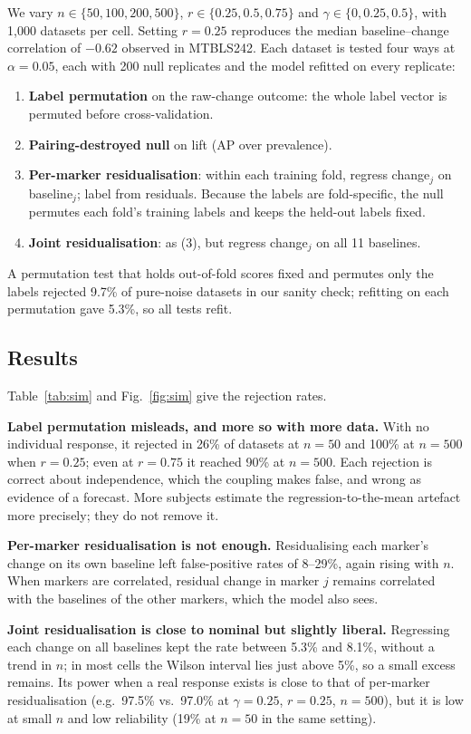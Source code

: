 \documentclass[conference]{IEEEtran}
\begin{document}
We vary $n\in\{50,100,200,500\}$, $r\in\{0.25,0.5,0.75\}$ and
$\gamma\in\{0,0.25,0.5\}$, with 1{,}000 datasets per cell. Setting $r=0.25$
reproduces the median baseline--change correlation of $-0.62$ observed in
MTBLS242. Each dataset is tested four ways at $\alpha=0.05$, each with 200
null replicates and the model refitted on every replicate:
\begin{enumerate}
  \item \textbf{Label permutation} on the raw-change outcome: the whole label
        vector is permuted before cross-validation.
  \item \textbf{Pairing-destroyed null} on lift (AP over prevalence).
  \item \textbf{Per-marker residualisation}: within each training fold,
        regress change$_j$ on baseline$_j$; label from residuals. Because
        the labels are fold-specific, the null permutes each fold's training
        labels and keeps the held-out labels fixed.
  \item \textbf{Joint residualisation}: as (3), but regress change$_j$ on all
        11 baselines.
\end{enumerate}
A permutation test that holds out-of-fold scores fixed and permutes only the
labels rejected 9.7\% of pure-noise datasets in our sanity check; refitting
on each permutation \cite{ojala2010} gave 5.3\%, so all tests refit.

\subsection{Results}
Table~\ref{tab:sim} and Fig.~\ref{fig:sim} give the rejection rates.

\textbf{Label permutation misleads, and more so with more data.} With no
individual response, it rejected in 26\% of datasets at $n=50$ and 100\% at
$n=500$ when $r=0.25$; even at $r=0.75$ it reached 90\% at $n=500$. Each
rejection is correct about independence, which the coupling makes false,
and wrong as evidence of a forecast. More subjects estimate the
regression-to-the-mean artefact more precisely; they do not remove it.

\textbf{Per-marker residualisation is not enough.} Residualising each
marker's change on its own baseline left false-positive rates of 8--29\%,
again rising with $n$. When markers are correlated, residual change in
marker $j$ remains correlated with the baselines of the other markers,
which the model also sees.

\textbf{Joint residualisation is close to nominal but slightly liberal.}
Regressing each change on all baselines kept the rate between 5.3\% and
8.1\%, without a trend in $n$; in most cells the Wilson interval lies just
above 5\%, so a small excess remains. Its power when a real response exists
is close to that of per-marker residualisation (e.g.\ 97.5\% vs.\ 97.0\% at
$\gamma=0.25$, $r=0.25$, $n=500$), but it is low at small $n$ and low
reliability (19\% at $n=50$ in the same setting).
\end{document}
